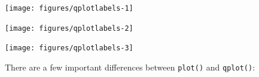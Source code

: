 \begin{flushleft}\texttt{[image: figures/qplotlabels-1]} \end{flushleft}

\begin{Shaded}
\begin{Highlighting}[]
\NormalTok{>}\StringTok{ }\NormalTok{(}
\NormalTok{+}\StringTok{    } 
\NormalTok{+}\StringTok{    } \NormalTok{(}
\NormalTok{+}\StringTok{    } \NormalTok{,  }
\NormalTok{+}\StringTok{    } \NormalTok{, }
\NormalTok{+}\StringTok{    } \NormalTok{,}\NormalTok{)}
\NormalTok{+}\StringTok{ }\NormalTok{)}
\end{Highlighting}
\end{Shaded}

\begin{flushleft}\texttt{[image: figures/qplotlabels-2]} \end{flushleft}

\begin{Shaded}
\begin{Highlighting}[]
\NormalTok{>}\StringTok{ }  \NormalTok{)}
\end{Highlighting}
\end{Shaded}

\begin{flushleft}\texttt{[image: figures/qplotlabels-3]} \end{flushleft}


There are a few important differences between \texttt{plot()} and
\texttt{qplot()}:

